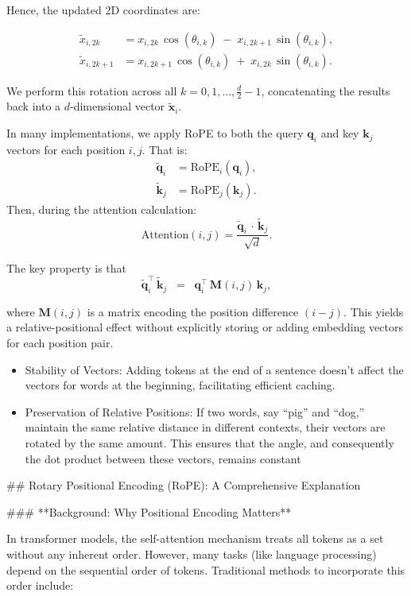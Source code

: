 Hence, the updated 2D coordinates are:

\[
\begin{aligned}
\tilde{x}_{i, 2k} &= x_{i, 2k}\,\cos(\theta_{i,k}) \;-\; x_{i, 2k+1}\,\sin(\theta_{i,k}),\\[6pt]
\tilde{x}_{i, 2k+1} &= x_{i, 2k+1}\,\cos(\theta_{i,k}) \;+\; x_{i, 2k}\,\sin(\theta_{i,k}).
\end{aligned}
\]

We perform this rotation across all \(k = 0, 1, \dots, \frac{d}{2}-1\), concatenating the results back into a \(d\)-dimensional vector \(\tilde{\mathbf{x}}_i\).

In many implementations, we apply RoPE to both the query \(\mathbf{q}_i\) and key \(\mathbf{k}_j\) vectors for each position \(i, j\). That is:
\[
\begin{aligned}
\tilde{\mathbf{q}}_i &= \text{RoPE}_i(\mathbf{q}_i), \\
\tilde{\mathbf{k}}_j &= \text{RoPE}_j(\mathbf{k}_j).
\end{aligned}
\]
Then, during the attention calculation:
\[
\text{Attention}(i, j) 
= \frac{\tilde{\mathbf{q}}_i \,\cdot\, \tilde{\mathbf{k}}_j}{\sqrt{d}}.
\]

The key property is that
\[
\tilde{\mathbf{q}}_i^\top \, \tilde{\mathbf{k}}_j
\;\;=\;\;
\mathbf{q}_i^\top\, \mathbf{M}(i,j)\, \mathbf{k}_j,
\]

where \(\mathbf{M}(i,j)\) is a matrix encoding the position difference \((i-j)\). This yields a relative-positional effect without explicitly storing or adding embedding vectors for each position pair.


\begin{itemize}
	\item Stability of Vectors: Adding tokens at the end of a sentence doesn't affect the vectors for words at the beginning, facilitating efficient caching.
		\item Preservation of Relative Positions: If two words, say ``pig'' and ``dog,'' maintain the same relative distance in different contexts, their vectors are rotated by the same amount. This ensures that the angle, and consequently the dot product between these vectors, remains constant
\end{itemize}

## Rotary Positional Encoding (RoPE): A Comprehensive Explanation

### **Background: Why Positional Encoding Matters**

In transformer models, the self-attention mechanism treats all tokens as a set without any inherent order. However, many tasks (like language processing) depend on the sequential order of tokens. Traditional methods to incorporate this order include:

